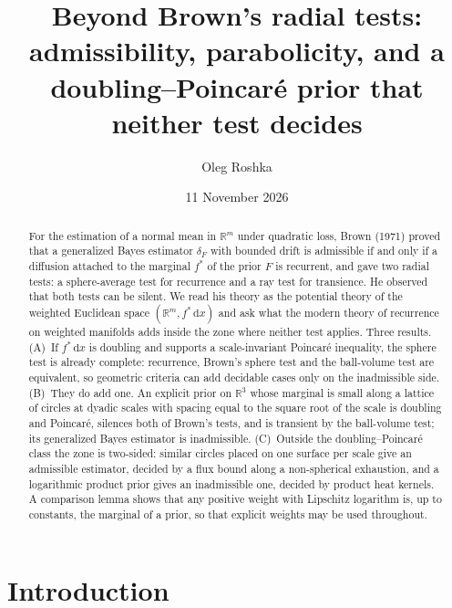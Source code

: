 \documentclass[11pt]{amsart}
\title[Beyond Brown's radial tests]{Beyond Brown's radial tests:\\ admissibility, parabolicity, and a doubling--Poincar\'e prior that neither test decides}
\author{Oleg Roshka}
\date{11 November 2026}
\newcommand{\R}{\mathbb{R}}
\newcommand{\dd}{\,\mathrm{d}}
\theoremstyle{plain}
\theoremstyle{definition}
\theoremstyle{remark}
\begin{document}
\begin{abstract}
For the estimation of a normal mean in $\R^m$ under quadratic loss, Brown (1971)
proved that a generalized Bayes estimator $\delta_F$ with bounded drift is
admissible if and only if a diffusion attached to the marginal $f^*$ of the
prior $F$ is recurrent, and
gave two radial tests: a sphere-average test for recurrence and a ray test for
transience. He observed that both tests can be silent. We read his theory as the
potential theory of the weighted Euclidean space $(\R^m,f^*\dd x)$ and ask what
the modern theory of recurrence on weighted manifolds adds inside the zone where
neither test applies. Three results. (A)~If $f^*\dd x$ is doubling and supports a
scale-invariant Poincar\'e inequality, the sphere test is already complete:
recurrence, Brown's sphere test and the ball-volume test are equivalent, so
geometric criteria can add decidable cases only on the inadmissible side.
(B)~They do add one. An explicit prior on $\R^3$ whose marginal is small along a
lattice of circles at dyadic scales with spacing equal to the square root of the scale is
doubling and Poincar\'e, silences both of Brown's tests, and is transient by the
ball-volume test; its generalized Bayes estimator is inadmissible. (C)~Outside
the doubling--Poincar\'e class the zone is two-sided: similar circles placed on
one surface per scale give an admissible estimator, decided by a flux bound along
a non-spherical exhaustion, and a logarithmic product prior gives an inadmissible
one, decided by product heat kernels. A comparison lemma shows that any positive
weight with Lipschitz logarithm is, up to constants, the marginal of a prior, so
that explicit weights may be used throughout.
\end{abstract}

\maketitle

\section{Introduction}\label{sec:intro}
\end{document}
